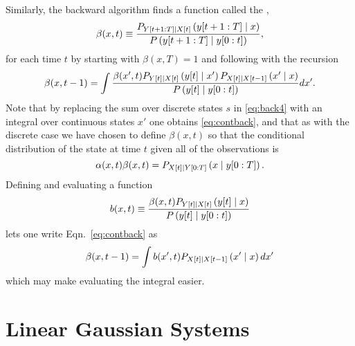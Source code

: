 Similarly, the backward algorithm finds a function called the
,
\begin{equation}
  \label{eq:contbeta}
  \beta(x,t) \equiv \frac{P_{Y[t+1:T]\mid {X}{[t]}}
  \left(y[t+1:T]\mid x \right)}{P\left(y[t+1:T]\mid y[0:t]
               \right)},
\end{equation}
for each time $t$ by starting with $\beta(x,T) = 1$ and following with
the recursion
\begin{equation}
  \label{eq:contback}
  \beta(x,t-1) = \int 
  \frac{\beta(x',t) P_{{Y}{[t]}\mid {X}{[t]}}\left({y}{[t]}\mid x' \right)
  P_{{X}{[t]}\mid {X}{[t-1]}}\left(x'\mid x \right)}
  {P\left({y}{[t]}\mid y[0:t] \right)} dx'.
\end{equation}
Note that by replacing the sum over discrete states $s$ in
\eqref{eq:back4} with an integral over continuous states $x'$ one
obtains \eqref{eq:contback}, and that as with the discrete case we
have chosen to define $\beta(x,t)$ so that the conditional
distribution of the state at time $t$ given all of the observations is
\begin{equation}
  \label{eq:contalphabeta}
  \alpha(x,t) \beta(x,t) = P_{{X}{[t]}\mid Y[0:T]}
  \left(x\mid y[0:T] \right).
\end{equation}
Defining and evaluating a \emph{} function
\begin{equation}
  \label{eq:bdef}
  b(x,t) \equiv \frac{\beta(x,t)
    P_{{Y}{[t]}\mid {X}{[t]}}\left({y}{[t]}\mid x
    \right)} {P\left({y}{[t]}\mid y[0:t] \right)}
\end{equation}
lets one write Eqn.~\eqref{eq:contback} as
\begin{equation*}
  \beta(x,t-1) = \int b(x',t) P_{{X}{[t]}\mid {X}{[t-1]}}\left(x'\mid x
  \right) dx'
\end{equation*}
which may make evaluating the integral easier.

\section{Linear Gaussian Systems}
\label{sec:LinearGaussian}

